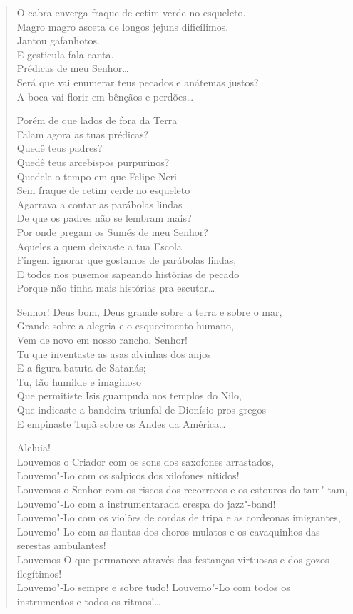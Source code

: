 {\begin{verse}
O cabra enverga fraque de cetim verde no esqueleto.\\
Magro magro asceta de longos jejuns dificílimos.\\
Jantou gafanhotos.\\
E gesticula fala canta.\\
Prédicas de meu Senhor\ldots{}\\
Será que vai enumerar teus pecados e anátemas justos?\\
A boca vai florir em bênçãos e perdões\ldots{}

Porém de que lados de fora da Terra\\
Falam agora as tuas prédicas?\\
Quedê teus padres?\\
Quedê teus arcebispos purpurinos?\\
Quedele o tempo em que Felipe Neri\\
Sem fraque de cetim verde no esqueleto\\
Agarrava a contar as parábolas lindas\\
De que os padres não se lembram mais?\\
Por onde pregam os Sumés de meu Senhor?\\
Aqueles a quem deixaste a tua Escola\\
Fingem ignorar que gostamos de parábolas lindas,\\
E todos nos pusemos sapeando histórias de pecado\\
Porque não tinha mais histórias pra escutar\ldots{}

Senhor! Deus bom, Deus grande sobre a terra e sobre o mar,\\
Grande sobre a alegria e o esquecimento humano,\\
Vem de novo em nosso rancho, Senhor!\\
Tu que inventaste as asas alvinhas dos anjos\\
E a figura batuta de Satanás;\\
Tu, tão humilde e imaginoso\\
Que permitiste Isis guampuda nos templos do Nilo,\\
Que indicaste a bandeira triunfal de Dionísio pros gregos\\
E empinaste Tupã sobre os Andes da América\ldots{}

Aleluia!\\
Louvemos o Criador com os sons dos saxofones arrastados,\\
Louvemo"-Lo com os salpicos dos xilofones nítidos!\\
Louvemos o Senhor com os riscos dos recorrecos e os estouros do tam"-tam,\\
Louvemo"-Lo com a instrumentarada crespa do jazz"-band!\\
Louvemo"-Lo com os violões de cordas de tripa e as cordeonas imigrantes,\\
Louvemo"-Lo com as flautas dos choros mulatos e os cavaquinhos das serestas ambulantes!\\
Louvemos O que permanece através das festanças virtuosas e dos gozos ilegítimos!\\
Louvemo"-Lo sempre e sobre tudo! Louvemo"-Lo com todos os instrumentos e todos os ritmos!\ldots{}


\end{verse}}

